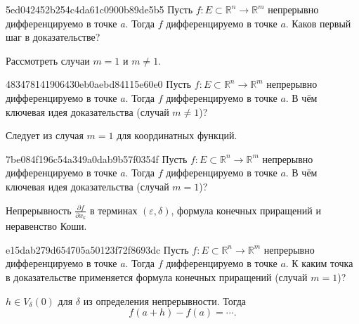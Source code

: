 \begin{note}{5ed042452b254c4da61c0900b89de5b5}
    Пусть \({ f : E \subset \mathbb R^{n} \to \mathbb R^{m} }\) непрерывно дифференцируемо в точке \({ a }\).
    Тогда \({ f }\) дифференцируемо в точке \({ a }\).
    Каков первый шаг в доказательстве?

    \begin{cloze}{1}
        Рассмотреть случаи \({ m = 1 }\) и \({ m \neq 1 }\).
    \end{cloze}
\end{note}

\begin{note}{483478141906430eb0aebd84115e60e0}
    Пусть \({ f : E \subset \mathbb R^{n} \to \mathbb R^{m} }\) непрерывно дифференцируемо в точке \({ a }\).
    Тогда \({ f }\) дифференцируемо в точке \({ a }\).
    В чём ключевая идея доказательства (случай \({ m \neq 1 }\))?

    \begin{cloze}{1}
        Следует из случая \({ m = 1 }\) для координатных функций.
    \end{cloze}
\end{note}

\begin{note}{7be084f196c54a349a0dab9b57f0354f}
    Пусть \({ f : E \subset \mathbb R^{n} \to \mathbb R^{m} }\) непрерывно дифференцируемо в точке \({ a }\).
    Тогда \({ f }\) дифференцируемо в точке \({ a }\).
    В чём ключевая идея доказательства (случай \({ m = 1 }\))?

    \begin{cloze}{1}
        Непрерывность \({ \frac{\partial f}{\partial x_k} }\) в терминах \({ (\varepsilon, \delta) }\), формула конечных приращений и неравенство Коши.
    \end{cloze}
\end{note}

\begin{note}{e15dab279d654705a50123f72f8693dc}
    Пусть \({ f : E \subset \mathbb R^{n} \to \mathbb R^{m} }\) непрерывно дифференцируемо в точке \({ a }\).
    Тогда \({ f }\) дифференцируемо в точке \({ a }\).
    К каким точка в доказательстве применяется формула конечных приращений (случай \({ m = 1 }\))?

    \begin{cloze}{1}
        \({ h \in V_{\delta}(0) }\) для \({ \delta }\) из определения непрерывности.
        Тогда
        \[
            f(a + h) - f(a) = \cdots.
        \]
    \end{cloze}
\end{note}

